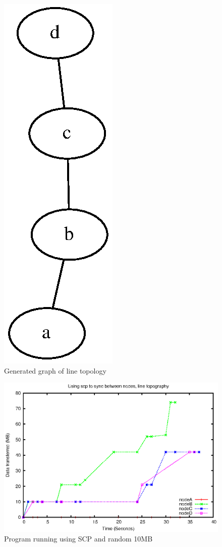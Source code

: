 \documentclass[12pt]{article}
\begin{document}
\pagebreak
\begin{figure}[ht!]
    \centering
    \includegraphics[height=0.4\textheight]{images/line-graph.eps}
    \caption{Generated graph of line topology}
    \label{fig:line_graph}
\end{figure}

\begin{figure}[hb!]
    \centering
    \includegraphics[height=0.4\textheight]{images/line-scp-10-fixes.eps}
    \caption{Program running using SCP and random 10MB}
    \label{fig:line_scp}
\end{figure}
\end{document}
